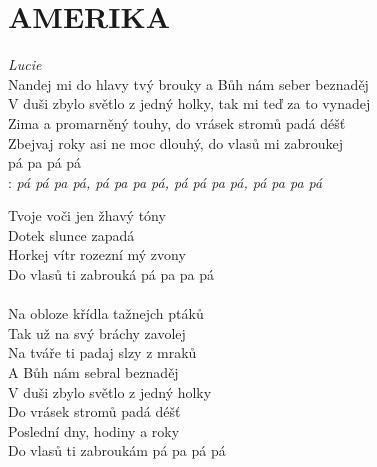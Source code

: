 \section*{\Huge AMERIKA}
\emph{Lucie}\\

Nandej mi do hlavy tvý brouky a Bůh nám seber beznaděj\\
V duši zbylo světlo z jedný holky, tak mi teď za to vynadej\\
Zima a promarněný touhy, do vrásek stromů padá déšť\\
Zbejvaj roky asi ne moc dlouhý, do vlasů mi zabroukej\\
pá pa pá pá\\

\textregistered:
\emph{
pá pá pa pá, pá pa pa pá, pá pá pa pá, pá pa pa pá\\
}

Tvoje voči jen žhavý tóny\\
Dotek slunce zapadá\\
Horkej vítr rozezní mý zvony\\
Do vlasů ti zabrouká pá pa pa pá\\
\textregistered\\

Na obloze křídla tažnejch ptáků\\
Tak už na svý bráchy zavolej\\
Na tváře ti padaj slzy z mraků\\
A Bůh nám sebral beznaděj\\
V duši zbylo světlo z jedný holky\\
Do vrásek stromů padá déšť\\
Poslední dny, hodiny a roky\\
Do vlasů ti zabroukám pá pa pá pá\\

\textregistered

\newpage
